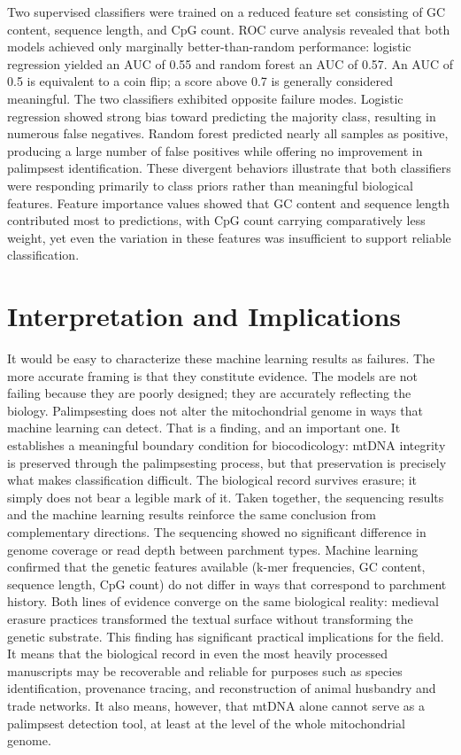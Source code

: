 \documentclass[final]{anthology-ch} %
\begin{document}
Two supervised classifiers were trained on a reduced feature set consisting of GC content, sequence length, and CpG count. ROC curve analysis revealed that both models achieved only marginally better-than-random performance: logistic regression yielded an AUC of 0.55 and random forest an AUC of 0.57. An AUC of 0.5 is equivalent to a coin flip; a score above 0.7 is generally considered meaningful. The two classifiers exhibited opposite failure modes. Logistic regression showed strong bias toward predicting the majority class, resulting in numerous false negatives. Random forest predicted nearly all samples as positive, producing a large number of false positives while offering no improvement in palimpsest identification. These divergent behaviors illustrate that both classifiers were responding primarily to class priors rather than meaningful biological features. Feature importance values showed that GC content and sequence length contributed most to predictions, with CpG count carrying comparatively less weight, yet even the variation in these features was insufficient to support reliable classification.

\section{Interpretation and Implications} \label{sec:interpretation}

It would be easy to characterize these machine learning results as failures. The more accurate framing is that they constitute evidence. The models are not failing because they are poorly designed; they are accurately reflecting the biology. Palimpsesting does not alter the mitochondrial genome in ways that machine learning can detect. That is a finding, and an important one. It establishes a meaningful boundary condition for biocodicology: mtDNA integrity is preserved through the palimpsesting process, but that preservation is precisely what makes classification difficult. The biological record survives erasure; it simply does not bear a legible mark of it. Taken together, the sequencing results and the machine learning results reinforce the same conclusion from complementary directions. The sequencing showed no significant difference in genome coverage or read depth between parchment types. Machine learning confirmed that the genetic features available (k-mer frequencies, GC content, sequence length, CpG count) do not differ in ways that correspond to parchment history. Both lines of evidence converge on the same biological reality: medieval erasure practices transformed the textual surface without transforming the genetic substrate. This finding has significant practical implications for the field. It means that the biological record in even the most heavily processed manuscripts may be recoverable and reliable for purposes such as species identification, provenance tracing, and reconstruction of animal husbandry and trade networks. It also means, however, that mtDNA alone cannot serve as a palimpsest detection tool, at least at the level of the whole mitochondrial genome.
\end{document}
